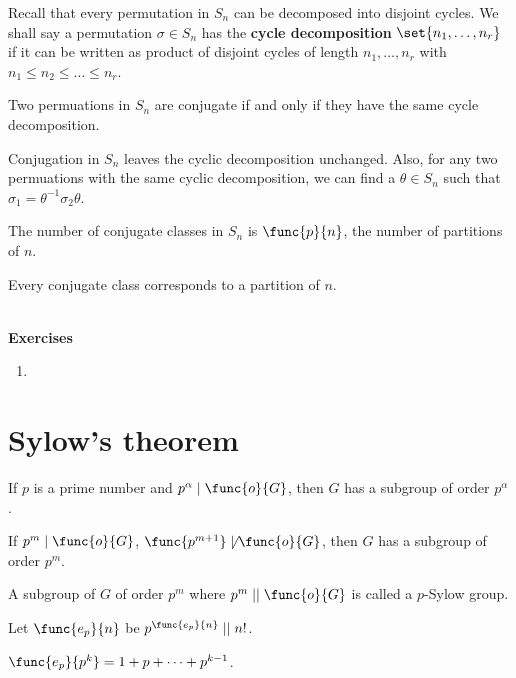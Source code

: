 Recall that every permutation in \(S_n\) can be decomposed into disjoint cycles. We shall say a permutation \(\sigma \in S_n\) has the \textbf{cycle decomposition} \(\set{n_1, \dots , n_r}\) if it can be written as product of disjoint cycles of length \(n_1, \dots ,n _r\) with \(n_1 \leq n_2 \leq \dots \leq n_r\).

\begin{lemma}
    Two permuations in \(S_n\) are conjugate if and only if they have the same cycle decomposition.
\end{lemma}

\begin{prooflemma}
    Conjugation in \(S_n\) leaves the cyclic decomposition unchanged. Also, for any two permuations with the same cyclic decomposition, we can find a \(\theta \in S_n\) such that \(\sigma_1 = \theta^{-1} \sigma_2 \theta\).
\end{prooflemma}
\begin{corollary}
    The number of conjugate classes in \(S_n\) is \(\func{p}{n}\), the number of partitions of \(n\).
\end{corollary}
\begin{prooflemma}
    Every conjugate class corresponds to a partition of \(n\).
\end{prooflemma}

\ \\ 
{\Large{\textbf{Exercises}}}
\begin{enumerate}
    \item 
\end{enumerate}
\section{Sylow's theorem}

\begin{theorem}[Sylow]
    If \(p\) is a prime number and \(p^{\alpha} \mid \func{o}{G}\), then \(G\) has a subgroup of order \(p^{\alpha}\).
\end{theorem}

\begin{corollary}
    If \(p^m \mid \func{o}{G}\), \(\func{p^{m+1}} \not\mid \func{o}{G}\), then \(G\) has a subgroup of order \(p^m\).
\end{corollary}

A subgroup of \(G\) of order \(p^m\) where \(p^m \mid\mid \func{o}{G}\) is called a \(p\)-Sylow group.

Let \(\func{e_p}{n}\) be \(p^{\func{e_p}{n}} \mid\mid n!\).
\begin{lemma}
    \(\func{e_p}{p^k} = 1 + p + \dots + p^{k-1}\).
\end{lemma}

